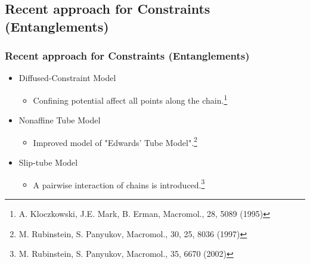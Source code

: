 \documentclass[12pt, dvipdfmx]{beamer}
\begin{document}
\subsection{Recent approach for Constraints (Entanglements)}
\begin{frame}
	\frametitle{Recent approach for Constraints (Entanglements)}
	
		\begin{itemize}
			\item Diffused-Constraint Model
			\begin{itemize}
				\item Confining potential affect all points along the chain.\footnote{\tiny{A. Kloczkowski, J.E. Mark, B. Erman, Macromol., 28, 5089 (1995)}}
			\end{itemize}
			\item Nonaffine Tube Model
			\begin{itemize}
				\item Improved model of "Edwards' Tube Model".\footnote{\tiny{M. Rubinstein, S. Panyukov, Macromol., 30, 25, 8036 (1997)}}
			\end{itemize}
			\item Slip-tube Model
			\begin{itemize}
				\item A pairwise interaction of chains is introduced.\footnote{\tiny{M. Rubinstein, S. Panyukov, Macromol., 35, 6670 (2002)}}
			\end{itemize}
		\end{itemize}


\end{frame}
\end{document}
